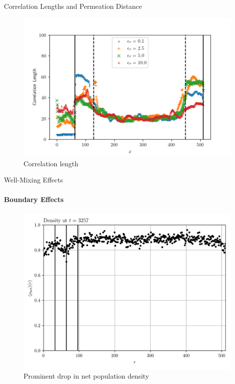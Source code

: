 \documentclass{beamer}
\begin{document}
    \begin{frame}[t]{Correlation Lengths and Permeation Distance}
        \begin{figure}[h]
            \centering
            \includegraphics[width=0.75\linewidth]{images/correlation_lengths.png}
            \caption{Correlation length}
            \label{fig:correlation_length}
        \end{figure}
        
    \end{frame}

    \begin{frame}[t]{Well-Mixing Effects}
        \framesubtitle{Boundary Effects}
        \begin{figure}[h]
            \centering
            \includegraphics[width=0.75\linewidth]{images/net_density_2_5.jpg}
            \caption{Prominent drop in net population density}
            \label{fig:mixing}
        \end{figure}
    \end{frame}
\end{document}
